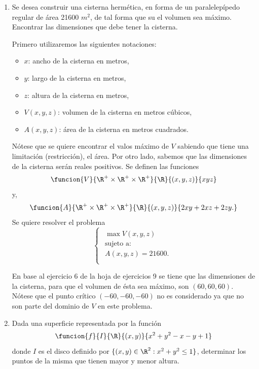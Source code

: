 \documentclass[a4,11pt]{aleph-examen}
\begin{document}
\begin{preguntas}
\begin{respuesta}
\begin{respuesta}
\begin{respuesta}
\begin{enumerate}
\item
    Se desea construir una cisterna hermética, en forma de un paralelepípedo regular de área 21600 $m^2$, de tal forma que su el volumen sea máximo. Encontrar las dimensiones que debe tener la cisterna.
    
\begin{respuesta}

    Primero utilizaremos las siguientes notaciones:
    \begin{itemize}
        \item $x$: ancho de la cisterna en metros,
        \item $y$: largo de la cisterna en metros,
        \item $z$: altura de la cisterna en metros,
        \item $V(x,y,z)$: volumen de la cisterna en metros cúbicos,
        \item $A(x,y,z)$: área de la cisterna en metros cuadrados.
    \end{itemize}
    Nótese que se quiere encontrar el valos máximo de $V$ sabiendo que tiene una limitación (restricción), el área. Por otro lado, sabemos que las dimensiones de la cisterna serán reales positivos. Se definen las funciones
    \[
         \funcion{V}{\R^+ \times \R^+ \times \R^+}{\R}{(x,y,z)}{xyz}
    \]
  	y,
	\[
        \funcion{A}{\R^+ \times \R^+ \times \R^+}{\R}{(x,y,z)}{2xy+2xz+2zy.}
    \] 
    Se quiere resolver el problema
    \[
        \begin{cases}
        \begin{array}{c}
		\max V(x,y,z)\\
		\text{sujeto  a:}\\
			A(x,y,z)=21600.\\		
		\end{array}
        \end{cases} 
    \]

    En base al ejercicio 6 de la hoja de ejercicios 9 se tiene que las dimensiones de la cisterna, para que el volumen de ésta sea  máximo, son $(60,60,60)$. Nótese que el punto crítico $(-60,-60,-60)$ no es considerado ya que no son parte del dominio de $V$ en este problema.  
\end{respuesta}

\item
    Dada una superficie representada por la función 
    \[
        \funcion{f}{I}{\R}{(x,y)}{x^2+y^2-x-y+1} 
    \]
    donde $I$ es el disco definido por $\lbrace (x,y) \in \R^2:x^2+y^2 \leq 1 \rbrace$, determinar los puntos de la misma que tienen mayor y menor altura. 


\end{enumerate}
\end{respuesta}
\end{respuesta}
\end{respuesta}
\end{preguntas}
\end{document}
